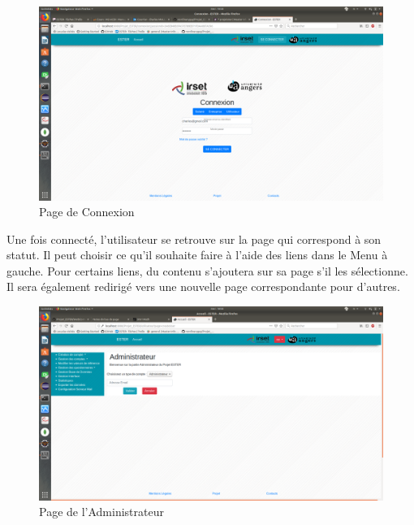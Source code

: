 \begin{figure}[H]
    \begin{center}
	\includegraphics[scale=0.2,trim=4cm 0cm 4cm 5.3cm, clip=true]{img/Connexion}
    \end{center}
    \caption{Page de Connexion}
\end{figure}

Une fois connecté, l'utilisateur se retrouve sur la page qui correspond à son statut. Il peut choisir ce qu'il souhaite faire à l'aide des liens dans le Menu à gauche. Pour certains liens, du contenu s'ajoutera sur sa page s'il les sélectionne. Il sera également redirigé vers une nouvelle page correspondante pour d'autres. 

\begin{figure}[H]
    \begin{center}
	\includegraphics[scale=0.2,trim=2.8cm 0.1cm 0.8cm 5.3cm, clip=true]{img/Admin}
    \end{center}
    \caption{Page de l'Administrateur}
\end{figure}

